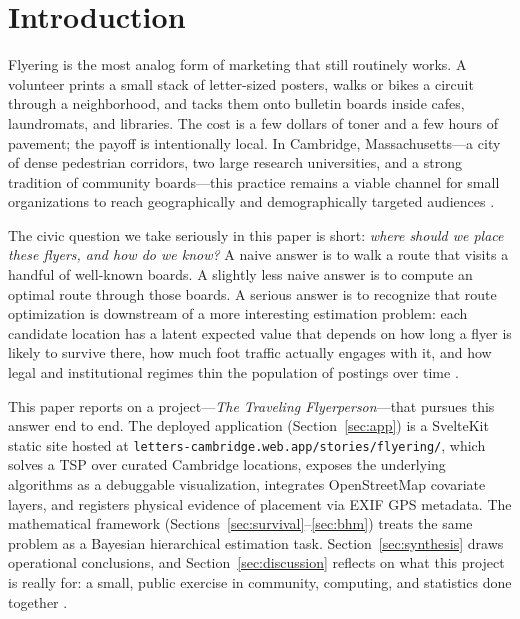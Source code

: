 \documentclass[sigconf,nonacm]{acmart}
\begin{document}
\section{Introduction}
\label{sec:intro}

Flyering is the most analog form of marketing that still routinely works. A volunteer prints a small stack of letter-sized posters, walks or bikes a circuit through a neighborhood, and tacks them onto bulletin boards inside cafes, laundromats, and libraries. The cost is a few dollars of toner and a few hours of pavement; the payoff is intentionally local. In Cambridge, Massachusetts---a city of dense pedestrian corridors, two large research universities, and a strong tradition of community boards---this practice remains a viable channel for small organizations to reach geographically and demographically targeted audiences \cite{cambridge-redditA, cambridge-redditB}.

The civic question we take seriously in this paper is short: \emph{where should we place these flyers, and how do we know?} A naive answer is to walk a route that visits a handful of well-known boards. A slightly less naive answer is to compute an optimal route through those boards. A serious answer is to recognize that route optimization is downstream of a more interesting estimation problem: each candidate location has a latent expected value that depends on how long a flyer is likely to survive there, how much foot traffic actually engages with it, and how legal and institutional regimes thin the population of postings over time \cite{mit-policy, duke-ordinances}.

This paper reports on a project---\emph{The Traveling Flyerperson}---that pursues this answer end to end. The deployed application (Section~\ref{sec:app}) is a SvelteKit static site hosted at \texttt{letters-cambridge.web.app/stories/flyering/}, which solves a TSP over curated Cambridge locations, exposes the underlying algorithms as a debuggable visualization, integrates OpenStreetMap covariate layers, and registers physical evidence of placement via EXIF GPS metadata. The mathematical framework (Sections~\ref{sec:survival}--\ref{sec:bhm}) treats the same problem as a Bayesian hierarchical estimation task. Section~\ref{sec:synthesis} draws operational conclusions, and Section~\ref{sec:discussion} reflects on what this project is really for: a small, public exercise in community, computing, and statistics done together \cite{cambridge-dev-org}.
\end{document}
